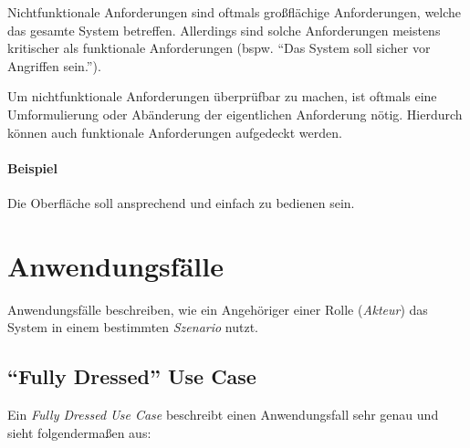 				Nichtfunktionale Anforderungen sind oftmals großflächige Anforderungen, welche das gesamte System betreffen. Allerdings sind solche Anforderungen meistens kritischer als funktionale Anforderungen (bspw. \enquote{Das System soll sicher vor Angriffen sein.}).
				
				Um nichtfunktionale Anforderungen überprüfbar zu machen, ist oftmals eine Umformulierung oder Abänderung der eigentlichen Anforderung nötig. Hierdurch können auch funktionale Anforderungen aufgedeckt werden.
				
				\paragraph{Beispiel}
					Die Oberfläche soll ansprechend und einfach zu bedienen sein.
	
	\section{Anwendungsfälle}
		Anwendungsfälle beschreiben, wie ein Angehöriger einer Rolle (\textit{Akteur}) das System in einem bestimmten \textit{Szenario} nutzt.
		
		\subsection{\enquote{Fully Dressed} Use Case}
			Ein \textit{Fully Dressed Use Case} beschreibt einen Anwendungsfall sehr genau und sieht folgendermaßen aus:
			
